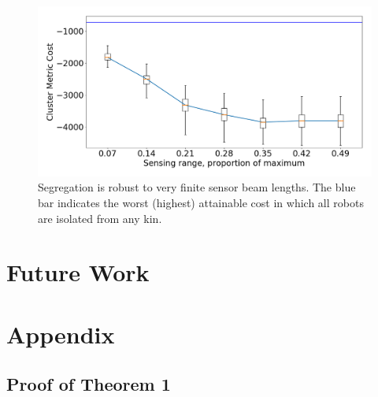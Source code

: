 \documentclass[conference]{IEEEtran}
\begin{document}
    \begin{figure}
      \centering
      \includegraphics[width=1\linewidth]{./images/beam_length.png}
      \caption{Segregation is robust to very finite sensor beam lengths. The blue bar indicates the worst (highest) attainable cost in which all robots are isolated from any kin.}
      \label{fig:beam_length}
    \end{figure}

\section{Future Work}





\onecolumn
\appendix
\section{Appendix}

  \subsection{Proof of Theorem 1} \label{thm:1}
\end{document}
